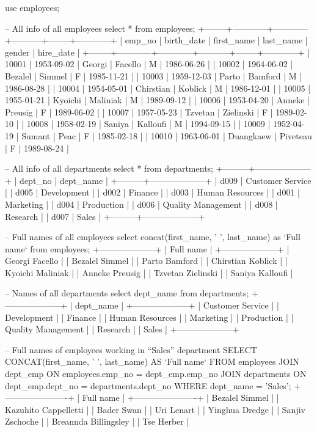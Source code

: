 use employees;

-- All info of all employees
select * from employees;
+--------+------------+------------+-----------+--------+------------+
| emp_no | birth_date | first_name | last_name | gender | hire_date  |
+--------+------------+------------+-----------+--------+------------+
|  10001 | 1953-09-02 | Georgi     | Facello   | M      | 1986-06-26 |
|  10002 | 1964-06-02 | Bezalel    | Simmel    | F      | 1985-11-21 |
|  10003 | 1959-12-03 | Parto      | Bamford   | M      | 1986-08-28 |
|  10004 | 1954-05-01 | Chirstian  | Koblick   | M      | 1986-12-01 |
|  10005 | 1955-01-21 | Kyoichi    | Maliniak  | M      | 1989-09-12 |
|  10006 | 1953-04-20 | Anneke     | Preusig   | F      | 1989-06-02 |
|  10007 | 1957-05-23 | Tzvetan    | Zielinski | F      | 1989-02-10 |
|  10008 | 1958-02-19 | Saniya     | Kalloufi  | M      | 1994-09-15 |
|  10009 | 1952-04-19 | Sumant     | Peac      | F      | 1985-02-18 |
|  10010 | 1963-06-01 | Duangkaew  | Piveteau  | F      | 1989-08-24 |

-- All info of all departments
select * from departments;
+---------+--------------------+
| dept_no | dept_name          |
+---------+--------------------+
| d009    | Customer Service   |
| d005    | Development        |
| d002    | Finance            |
| d003    | Human Resources    |
| d001    | Marketing          |
| d004    | Production         |
| d006    | Quality Management |
| d008    | Research           |
| d007    | Sales              |
+---------+--------------------+

-- Full names of all employees
select concat(first_name, ' ', last_name) as `Full name` from employees;
+--------------------+
| Full name          |
+--------------------+
| Georgi Facello     |
| Bezalel Simmel     |
| Parto Bamford      |
| Chirstian Koblick  |
| Kyoichi Maliniak   |
| Anneke Preusig     |
| Tzvetan Zielinski  |
| Saniya Kalloufi    |

-- Names of all departments
select dept_name from departments;
+--------------------+
| dept_name          |
+--------------------+
| Customer Service   |
| Development        |
| Finance            |
| Human Resources    |
| Marketing          |
| Production         |
| Quality Management |
| Research           |
| Sales              |
+--------------------+

-- Full names of employees working in “Sales” department
SELECT 
    CONCAT(first_name, ' ', last_name) AS `Full name`
FROM
    employees
        JOIN
    dept_emp ON employees.emp_no = dept_emp.emp_no
        JOIN
    departments ON dept_emp.dept_no = departments.dept_no
WHERE
    dept_name = 'Sales';
+----------------------+
| Full name            |
+----------------------+
| Bezalel Simmel       |
| Kazuhito Cappelletti |
| Bader Swan           |
| Uri Lenart           |
| Yinghua Dredge       |
| Sanjiv Zschoche      |
| Breannda Billingsley |
| Tse Herber           |

